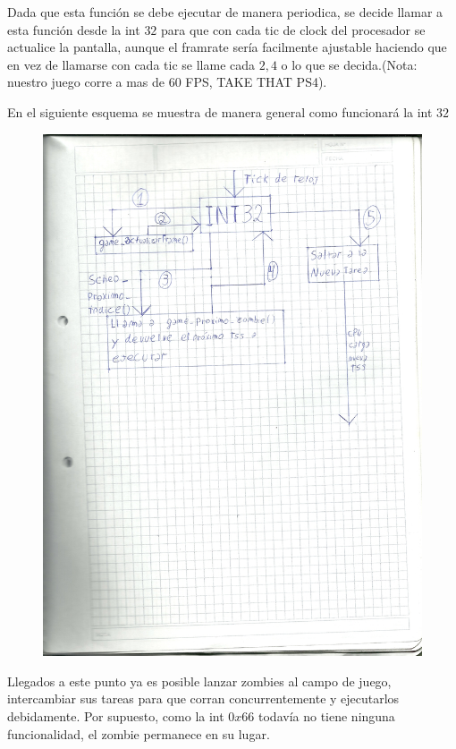 \documentclass[a4paper]{article}
\begin{document}
Dada que esta función se debe ejecutar de manera periodica, se decide llamar a esta función desde la int $32$ para que con cada tic de clock del procesador se actualice la pantalla, aunque el framrate sería facilmente ajustable haciendo que en vez de llamarse con cada tic se llame cada $2, 4$ o lo que se decida.(Nota: nuestro juego corre a mas de 60 FPS, TAKE THAT PS4).

En el siguiente esquema se muestra de manera general como funcionará la int $32$

\begin{figure}[h!]
  \begin{center}
\includegraphics[scale=0.3]{dibujos/dibujo2.jpg}\\
  \end{center}
\end{figure}


Llegados a este punto ya es posible lanzar zombies al campo de juego, intercambiar sus tareas para que corran concurrentemente y ejecutarlos debidamente. Por supuesto, como la int $0x66$ todavía no tiene ninguna funcionalidad, el zombie permanece en su lugar.
\end{document}
